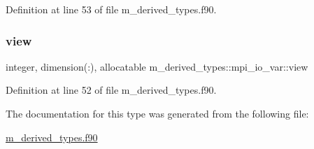 Definition at line 53 of file m\+\_\+derived\+\_\+types.\+f90.

\mbox{\label{structm__derived__types_1_1mpi__io__var_a19194d57a71bab3f81f1bb6c05743fed}} 
\subsubsection{\texorpdfstring{view}{view}}
{\footnotesize\ttfamily integer, dimension(\+:), allocatable m\+\_\+derived\+\_\+types\+::mpi\+\_\+io\+\_\+var\+::view}



Definition at line 52 of file m\+\_\+derived\+\_\+types.\+f90.



The documentation for this type was generated from the following file\+:\begin{DoxyCompactItemize}
\item 
\hyperlink{m__derived__types_8f90}{m\+\_\+derived\+\_\+types.\+f90}\end{DoxyCompactItemize}
